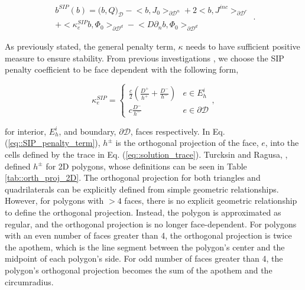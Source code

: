 \begin{equation}
\label{eq::SIP_linear_form}
\begin{aligned}
b^{SIP} (b) = \Big(  b, Q  \Big)_{\mathcal{D}}  - \Big<   b, J_{0}  \Big>_{\partial \mathcal{D}^n} +  2 \Big<  b, J^{inc}  \Big>_{\partial \mathcal{D}^r} \\ + \Big< \kappa_e^{SIP}  b, \Phi_0  \Big>_{\partial \mathcal{D}^d} - \Big<    D \partial_n b ,\Phi_0 \Big>_{\partial \mathcal{D}^d} 
\end{aligned} .
\end{equation}

\noindent As previously stated, the general penalty term, $\kappa$ needs to have sufficient positive measure to ensure stability. From previous investigations \cite{ref::DSA_wang_ragusa,wang2009adaptive,turcksin2014discontinuous}, we choose the SIP penalty coefficient to be face dependent with the following form,

\begin{equation}
\kappa_e^{SIP} = 
\begin{cases}
	\frac{c}{2} \left(  \frac{D^+}{h^+} + \frac{D^-}{h^-} \right) & e \in E_h^i\\ 
	c \frac{D^-}{h^-}& e \in \partial \mathcal{D}
\end{cases},
\label{eq::SIP_penalty_term}
\end{equation}

\noindent for interior, $E_h^i$, and boundary, $\partial \mathcal{D}$, faces respectively. In Eq. (\ref{eq::SIP_penalty_term}), $h^\pm$ is the orthogonal projection of the face, $e$, into the cells defined by the trace in Eq. (\ref{eq::solution_trace}). Turcksin and Ragusa, \cite{turcksin2014discontinuous}, defined $h^\pm$ for 2D polygons, whose definitions can be seen in Table \ref{tab::orth_proj_2D}. The orthogonal projection for both triangles and quadrilaterals can be explicitly defined from simple geometric relationships. However, for polygons with $>4$ faces, there is no explicit geometric relationship to define the orthogonal projection. Instead, the polygon is approximated as regular, and the orthogonal projection is no longer face-dependent. For polygons with an even number of faces greater than 4, the orthogonal projection is twice the apothem, which is the line segment between the polygon's center and the midpoint of each polygon's side. For odd number of faces greater than 4, the polygon's orthogonal projection becomes the sum of the apothem and the circumradius.

